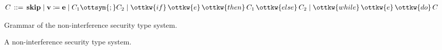 \begin{figure}[t]
\centering\begin{align*}
C \, ::={ }& \, \mathbf{skip} \mid
\mathbf{v}\coloneqq{}\mathbf{e} \mid
\nonterm C_{{\mathrm{1}}}  \ottsym{;}  \nonterm C_{{\mathrm{2}}} \mid
\ottkw{if} \, \ottkw{e} \, \ottkw{then} \, \nonterm C_{{\mathrm{1}}} \, \ottkw{else} \, \nonterm C_{{\mathrm{2}}} \mid
\ottkw{while} \, \ottkw{e} \, \ottkw{do} \, \nonterm C
\end{align*}
\caption{Grammar of the non-interference security type system.}\label{fig:ni-syntax}
\end{figure}
\begin{figure}[t]
\centering{}
\centering{}
\caption[Non-interference security type system.]{A non-interference security type system.}\label{fig:ni-types}
\end{figure}

